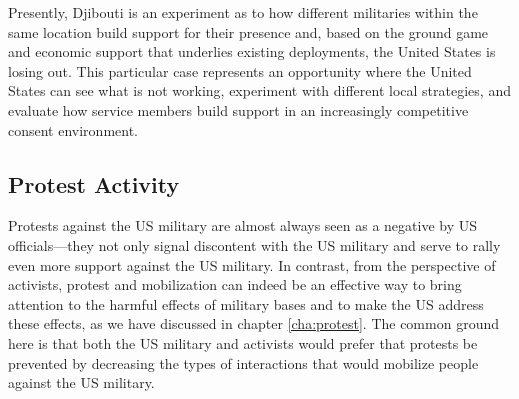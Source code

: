 Presently, Djibouti is an experiment as to how different militaries within the same location build support for their presence and, based on the ground game and economic support that underlies existing deployments, the United States is losing out.\cite{Bearak2019} This particular case represents an opportunity where the United States can see what is not working, experiment with different local strategies, and evaluate how service members build support in an increasingly competitive consent environment. 

\subsection*{Protest Activity}

Protests against the US military are almost always seen as a negative by US officials---they not only signal discontent with the US military and serve to rally even more support against the US military. In contrast, from the perspective of activists, protest and mobilization can indeed be an effective way to bring attention to the harmful effects of military bases and to make the US address these effects, as we have discussed in chapter \ref{cha:protest}. The common ground here is that both the US military and activists would prefer that protests be prevented by decreasing the types of interactions that would mobilize people against the US military.


